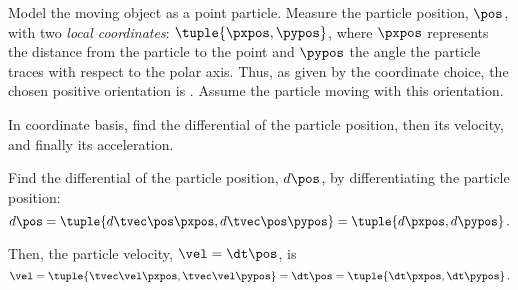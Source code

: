 \begin{solution}
  Model the moving object as a point particle. Measure the particle position, $\pos$, with two \emph{local coordinates}: $\tuple{\pxpos, \pypos}$, where $\pxpos$ represents the distance from the particle to the point and $\pypos$ the angle the particle traces with respect to the polar axis. Thus, as given by the coordinate choice, the chosen positive orientation is . Assume the particle moving with this orientation.

In coordinate basis, find the differential of the particle position, then its velocity, and finally its acceleration.

Find the differential of the particle position, $d\pos$, by differentiating the particle position:
%
\begin{equation*}
  d\pos = \tuple{d\tvec\pos\pxpos, d\tvec\pos\pypos} 
        = \tuple{d\pxpos, d\pypos}\,.
\end{equation*}

Then, the particle velocity, $\vel = \dt\pos$, is
%
\begin{equation*}
  \vel = \tuple{\tvec\vel\pxpos, \tvec\vel\pypos}
       = \dt\pos
       = \tuple{\dt\pxpos, \dt\pypos}\,.
\end{equation*}


\end{solution}
